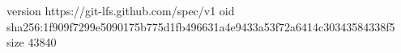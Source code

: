 version https://git-lfs.github.com/spec/v1
oid sha256:1f909f7299e5090175b775d1fb496631a4e9433a53f72a6414c30343584338f5
size 43840
